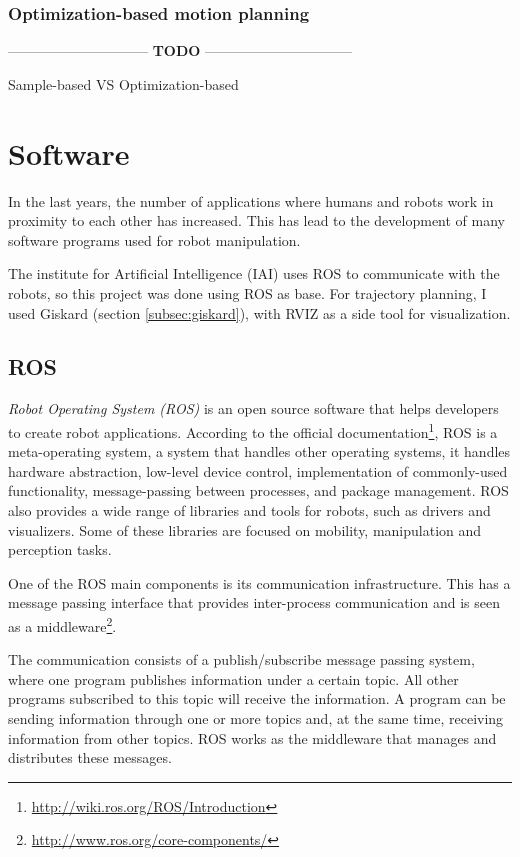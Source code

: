 \subsubsection{Optimization-based motion planning}

------------------------------ \textbf{TODO} --------------------------------

Sample-based VS Optimization-based

\section{Software}
In the last years, the number of applications where humans and robots work in proximity to each other has increased. This has lead to the development of many software programs used for robot manipulation. 

The  institute for Artificial Intelligence (IAI) uses ROS to communicate with the robots, so this project was done using ROS as base. For trajectory planning, I used Giskard (section \ref{subsec:giskard}), with RVIZ as a side tool for visualization.

\subsection{ROS}

\textit{Robot Operating System (ROS)} is an open source software that helps developers to create robot applications. According to the official documentation\footnote{\url{http://wiki.ros.org/ROS/Introduction}}, ROS is a meta-operating system, a system that handles other operating systems, it handles hardware abstraction, low-level device control, implementation of commonly-used functionality, message-passing between processes, and package management. ROS also provides a wide range of libraries and tools for robots, such as drivers and visualizers. Some of these libraries are focused on mobility, manipulation and perception tasks.

One of the ROS main components is its communication infrastructure. This has a message passing interface that provides inter-process communication and is seen as a middleware\footnote{\url{http://www.ros.org/core-components/}}. 

The communication consists of a publish/subscribe message passing system, where one program publishes information under a certain topic. All other programs subscribed to this topic will receive the information. A program can be sending information through one or more topics and, at the same time, receiving information from other topics. ROS works as the middleware that manages and distributes these messages.

